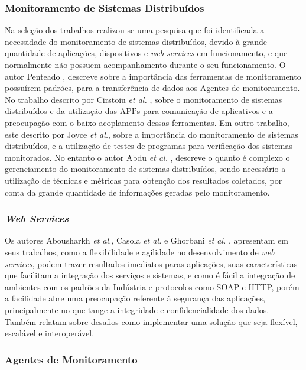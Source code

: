 \subsubsection{Monitoramento de Sistemas Distribuídos}
Na seleção dos trabalhos realizou-se uma pesquisa que foi identificada a necessidade do monitoramento de sistemas distribuídos, devido à grande quantidade de  aplicações, dispositivos e \textit{web services} em funcionamento, e que normalmente não possuem acompanhamento durante o seu funcionamento. O autor Penteado \cite{penteado2012jmonitor}, descreve sobre a importância das ferramentas de monitoramento possuírem padrões, para a transferência de dados aos Agentes de monitoramento. No trabalho descrito por Cirstoiu \textit{et al.} \cite{cirstoiu2007monitoring},  sobre o monitoramento de sistemas distribuídos e da utilização das API's para comunicação de aplicativos e a preocupação com o baixo acoplamento dessas ferramentas. Em outro trabalho,  este descrito por Joyce \textit{et al.}\cite{joyce1987monitoring}, sobre a importância do monitoramento de sistemas distribuídos, e a utilização de testes de programas para verificação dos sistemas monitorados. No entanto o autor Abdu \textit{et al.} \cite{abdu1995investigation}, descreve o quanto é complexo o gerenciamento do monitoramento de sistemas distribuídos, sendo necessário a utilização de técnicas e métricas para obtenção dos resultados coletados, por conta da grande quantidade de informações geradas pelo monitoramento.  

\subsubsection{\textit{Web Services}}

Os autores Abousharkh \textit{et al.}, Casola \textit{et al.} e Ghorbani \textit{et al.} \cite{abousharkh2011service,casola2009sensim,ghorbani2013personal}, apresentam em seus trabalhos, como a flexibilidade e agilidade no desenvolvimento de \textit{web services}, podem trazer resultados imediatos paras aplicações, suas características que facilitam a integração dos serviços e sistemas, e como é fácil a integração de ambientes com os padrões da Indústria e protocolos como SOAP e HTTP, porém a facilidade abre uma preocupação referente à segurança das aplicações, principalmente no que tange a integridade e confidencialidade dos dados.  Também relatam sobre desafios como implementar uma solução que seja flexível, escalável e interoperável.  

\subsubsection{Agentes de Monitoramento}

